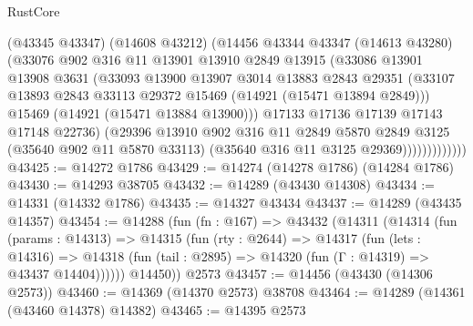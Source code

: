 \begin{lexlean}{RustCore}
\begin{coremodule}
                      (@43345 @43347)
                      (@14608 @43212)
                      (@14456
                        @43344
                        @43347
                        (@14613 @43280)
                        (@33076
                          @902
                          @316
                          @11
                          @13901
                          @13910
                          @2849
                          @13915
                          (@33086
                            @13901
                            @13908
                            @3631
                            (@33093
                              @13900
                              @13907
                              @3014
                              @13883
                              @2843
                              @29351
                              (@33107
                                @13893
                                @2843
                                @33113
                                @29372
                                @15469
                                (@14921 (@15471 @13894 @2849)))
                              @15469
                              (@14921 (@15471 @13884 @13900)))
                            @17133
                            @17136
                            @17139
                            @17143
                            @17148
                            @22736)
                          (@29396
                            @13910
                            @902
                            @316
                            @11
                            @2849
                            @5870
                            @2849
                            @3125
                            (@35640 @902 @11 @5870 @33113)
                            (@35640 @316 @11 @3125 @29369)))))))))))))
@43425 := @14272 @1786
@43429 := @14274 (@14278 @1786) (@14284 @1786)
@43430 := @14293 @38705
@43432 := @14289 (@43430 @14308)
@43434 := @14331 (@14332 @1786)
@43435 := @14327 @43434
@43437 := @14289 (@43435 @14357)
@43454 := @14288
    (fun (fn : @167) =>
    @43432
      (@14311
        (@14314
          (fun (params : @14313) =>
          @14315
            (fun (rty : @2644) =>
            @14317
              (fun (lets : @14316) =>
              @14318 (fun (tail : @2895) => @14320 (fun (Γ : @14319) => @43437 @14404))))))
        @14450))
    @2573
@43457 := @14456 (@43430 (@14306 @2573))
@43460 := @14369 (@14370 @2573) @38708
@43464 := @14289 (@14361 (@43460 @14378) @14382)
@43465 := @14395 @2573

\end{coremodule}
\end{lexlean}
